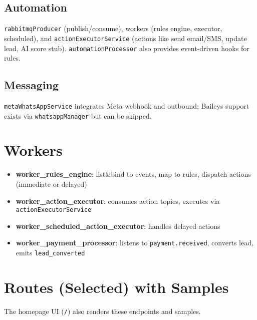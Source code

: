 \documentclass[11pt,a4paper]{article}
\begin{document}
\subsection{Automation}
\texttt{rabbitmqProducer} (publish/consume), workers (rules engine, executor, scheduled), and \texttt{actionExecutorService} (actions like send email/SMS, update lead, AI score stub). \texttt{automationProcessor} also provides event-driven hooks for rules.

\subsection{Messaging}
\texttt{metaWhatsAppService} integrates Meta webhook and outbound; Baileys support exists via \texttt{whatsappManager} but can be skipped.

\section{Workers}
\begin{itemize}[noitemsep]
  \item \textbf{worker\_rules\_engine}: list\&bind to events, map to rules, dispatch actions (immediate or delayed)
  \item \textbf{worker\_action\_executor}: consumes action topics, executes via \texttt{actionExecutorService}
  \item \textbf{worker\_scheduled\_action\_executor}: handles delayed actions
  \item \textbf{worker\_payment\_processor}: listens to \texttt{payment.received}, converts lead, emits \texttt{lead\_converted}
\end{itemize}

\section{Routes (Selected) with Samples}
The homepage UI (\texttt{/}) also renders these endpoints and samples.
\end{document}
